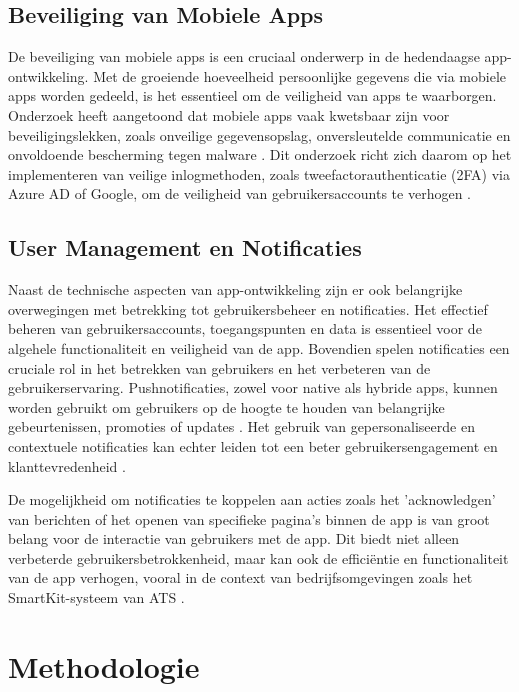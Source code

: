 \subsection{Beveiliging van Mobiele Apps}
\noindent De beveiliging van mobiele apps is een cruciaal onderwerp in de hedendaagse app-ontwikkeling. Met de groeiende hoeveelheid persoonlijke gegevens die via mobiele apps worden gedeeld, is het essentieel om de veiligheid van apps te waarborgen. Onderzoek heeft aangetoond dat mobiele apps vaak kwetsbaar zijn voor beveiligingslekken, zoals onveilige gegevensopslag, onversleutelde communicatie en onvoldoende bescherming tegen malware \autocite{Zhu2014}. Dit onderzoek richt zich daarom op het implementeren van veilige inlogmethoden, zoals tweefactorauthenticatie (2FA) via Azure AD of Google, om de veiligheid van gebruikersaccounts te verhogen \autocite{Aussems2021}.

\subsection{User Management en Notificaties}
\noindent Naast de technische aspecten van app-ontwikkeling zijn er ook belangrijke overwegingen met betrekking tot gebruikersbeheer en notificaties. Het effectief beheren van gebruikersaccounts, toegangspunten en data is essentieel voor de algehele functionaliteit en veiligheid van de app. Bovendien spelen notificaties een cruciale rol in het betrekken van gebruikers en het verbeteren van de gebruikerservaring. Pushnotificaties, zowel voor native als hybride apps, kunnen worden gebruikt om gebruikers op de hoogte te houden van belangrijke gebeurtenissen, promoties of updates \autocite{Android2024}. Het gebruik van gepersonaliseerde en contextuele notificaties kan echter leiden tot een beter gebruikersengagement en klanttevredenheid \autocite{Sarin}.

\noindent De mogelijkheid om notificaties te koppelen aan acties zoals het 'acknowledgen' van berichten of het openen van specifieke pagina's binnen de app is van groot belang voor de interactie van gebruikers met de app. Dit biedt niet alleen verbeterde gebruikersbetrokkenheid, maar kan ook de efficiëntie en functionaliteit van de app verhogen, vooral in de context van bedrijfsomgevingen zoals het SmartKit-systeem van ATS \autocite{Weichbroth2020}.



\section{Methodologie}
\label{sec:methodologie}

